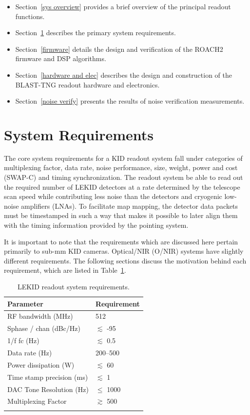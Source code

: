 \begin{itemize}[nosep]
  \item Section~\ref{sys overview} provides a brief overview of the principal readout functions.
  \item Section~\ref{sys reqs} describes the primary system requirements.
  \item Section~\ref{firmware} details the design and verification of the ROACH2 firmware and DSP algorithms.
  \item Section~\ref{hardware and elec} describes the design and construction of the BLAST-TNG readout hardware and electronics.
  \item Section~\ref{noise verify} presents the results of noise verification measurements.
\end{itemize}

\section{System Requirements}\label{sys reqs}

The core system requirements for a KID readout system fall under categories of multiplexing factor, data rate, noise performance, size, weight, power and cost (SWAP-C) and timing synchronization. The readout system be able to read out the required number of LEKID detectors at a rate determined by the telescope scan speed while contributing less noise than the detectors and cryogenic low-noise amplifiers (LNAs). To facilitate map mapping, the detector data packets must be timestamped in such a way that makes it possible to later align them with the timing information provided by the pointing system.

It is important to note that the requirements which are discussed here pertain primarily to sub-mm KID cameras. Optical/NIR (O/NIR) systems have slightly different requirements. The following sections discuss the motivation behind each requirement, which are listed in Table~\ref{tab:sys reqs}.

\begin{table}[!htbp]
\centering
\begin{tabular}{@{}ll@{}}
\dtoprule
Parameter & Requirement \\ \midrule
RF bandwidth (MHz) & 512 \\
\gls{Sphase} / chan (dBc/Hz) & $\lesssim$ -95 \\
1/f \gls{fc} (Hz) & $\lesssim$ 0.5 \\
Data rate (Hz) & 200--500 \\
Power dissipation (W) & $\lesssim$ 60 \\
Time stamp precision (ms) & $\lesssim$ 1 \\
DAC Tone Resolution (Hz) & $\leq$ 1000 \\
Multiplexing Factor & $\gtrsim$ 500 \\ \dbottomrule
\\
\end{tabular}
\caption{LEKID readout system requirements.}
\label{tab:sys reqs}
\end{table}

